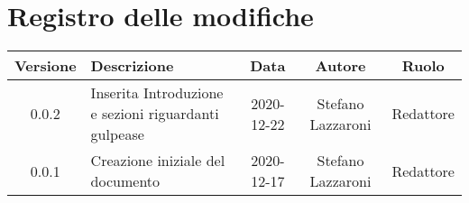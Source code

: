 \section*{Registro delle modifiche}

\begin{center}
	\begin{longtable}{|c|p{5cm}|c|c|c|}
	\hline
	\rowcolor{lighter-grayer}
	\textbf{Versione} & \textbf{Descrizione} & \textbf{Data} & \textbf{Autore} & \textbf{Ruolo} \\
	\hline
	\endfirsthead


	\hline
	0.0.2 & Inserita Introduzione e sezioni riguardanti gulpease & 2020-12-22 & Stefano Lazzaroni & Redattore\\
    0.0.1 & Creazione iniziale del documento & 2020-12-17 & Stefano Lazzaroni & Redattore\\
	\hline

	\end{longtable}
\end{center}